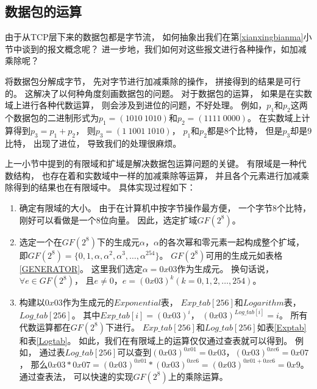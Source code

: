 \subsection{数据包的运算}
由于从TCP层下来的数据包都是字节流，
如何抽象出我们在第\ref{xianxingbianma}小节中谈到的报文概念呢？
进一步地，我们如何对这些报文进行各种操作，如加减乘除呢？
\par
将数据包分解成字节，
先对字节进行加减乘除的操作，
拼接得到的结果是可行的。
这解决了以何种角度刻画数据包的问题。
对于数据包的运算，
如果是在实数域上进行各种代数运算，
则会涉及到进位的问题，不好处理。
例如，$p_{1}$和$p_{2}$这两个数据包的二进制形式为$p_{1}=\left(1010\ 1010\right)$和$p_{2}=\left(1111\ 0000\right)$。
在实数域上计算得到$p_{3}=p_{1}+p_{2}$，
则$p_{3}=\left(1\ 1001\ 1010\right)$，
$p_{1}$和$p_{2}$都是8个比特，
但是$p_{3}$却是$9$比特，
出现了进位，
导致我们的处理很麻烦。
\par
上一小节中提到的有限域和扩域是解决数据包运算问题的关键。
有限域是一种代数结构，
也存在着和实数域中一样的加减乘除等运算，
并且各个元素进行加减乘除得到的结果也在有限域中。
具体实现过程如下：
\begin{enumerate}[fullwidth,itemindent=2em,label=(\arabic*)]
	\item 确定有限域的大小。
	由于在计算机中按字节操作最方便，
	一个字节8个比特，
	刚好可以看做是一个8位向量。
	因此，选定扩域$GF\left(2^8\right)$。
	\item 选定一个在$GF\left(2^8\right)$下的生成元$\alpha$，$\alpha$的各次幂和零元素一起构成整个扩域，
	即$GF\left(2^8\right)=\{0,1,\alpha,\alpha^2,\alpha^3,\dots,\alpha^{254}\}$。
	$GF\left(2^8\right)$可用的生成元如表格\ref{GENERATOR}。
	这里我们选定$\alpha=0x03$作为生成元。
	换句话说，$\forall e \in GF\left(2^8\right) $，
	且$e \neq 0$，$e=\left(0x03\right)^{k}\left(k=0,1,2,\dots,254\right)$。
	\item 构建以$0x03$作为生成元的$Exponential$表，
	$Exp\_tab[256]$和$Logarithm$表，
	$Log\_tab[256]$。
	其中$Exp\_tab[i]=\left(0x03\right)^{i}$，
	$\left(0x03\right)^{Log\_tab[i]}=i$。
	所有代数运算都在$GF\left(2^8\right)$下进行。
	$Exp\_tab[256]$和$Log\_tab[256]$如表\ref{Exptab}和表\ref{Logtab}。
	如此，我们在有限域上的运算仅仅通过查表就可以得到。
	例如，
	通过表$Log\_tab[256]$可以查到$\left(0x03\right)^{0x01}=0x03$，$\left(0x03\right)^{0xc6}=0x07$，
	那么$0x03*0x07=\left(0x03\right)^{0x01}*\left(0x03\right)^{0xc6}=\left(0x03\right)^{0x01+0xc6}=0x9$。
	通过查表法，
	可以快速的实现$GF\left(2^8\right)$上的乘除运算。
\end{enumerate}

